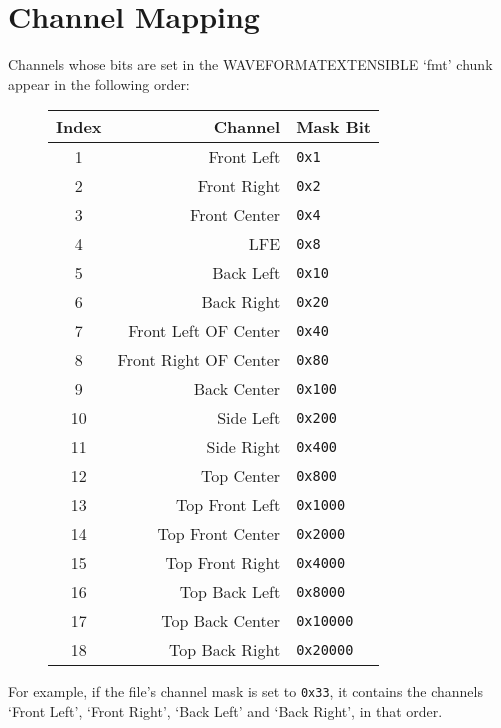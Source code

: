 \section{Channel Mapping}
Channels whose bits are set in the WAVEFORMATEXTENSIBLE `fmt' chunk
appear in the following order:
\begin{figure}[h]
\begin{tabular}{| c | r | l |}
\hline
Index & Channel & Mask Bit \\
\hline
1 & Front Left & \texttt{0x1} \\
2 & Front Right & \texttt{0x2} \\
3 & Front Center & \texttt{0x4} \\
4 & LFE & \texttt{0x8} \\
5 & Back Left & \texttt{0x10} \\
6 & Back Right & \texttt{0x20} \\
7 & Front Left OF Center & \texttt{0x40} \\
8 & Front Right OF Center & \texttt{0x80} \\
9 & Back Center & \texttt{0x100} \\
10 & Side Left & \texttt{0x200} \\
11 & Side Right & \texttt{0x400} \\
12 & Top Center & \texttt{0x800} \\
13 & Top Front Left & \texttt{0x1000} \\
14 & Top Front Center & \texttt{0x2000} \\
15 & Top Front Right & \texttt{0x4000} \\
16 & Top Back Left & \texttt{0x8000} \\
17 & Top Back Center & \texttt{0x10000} \\
18 & Top Back Right & \texttt{0x20000} \\
\hline
\end{tabular}
\end{figure}
\par
\noindent
For example, if the file's channel mask is set to \texttt{0x33},
it contains the channels `Front Left', `Front Right',
`Back Left' and `Back Right', in that order.
